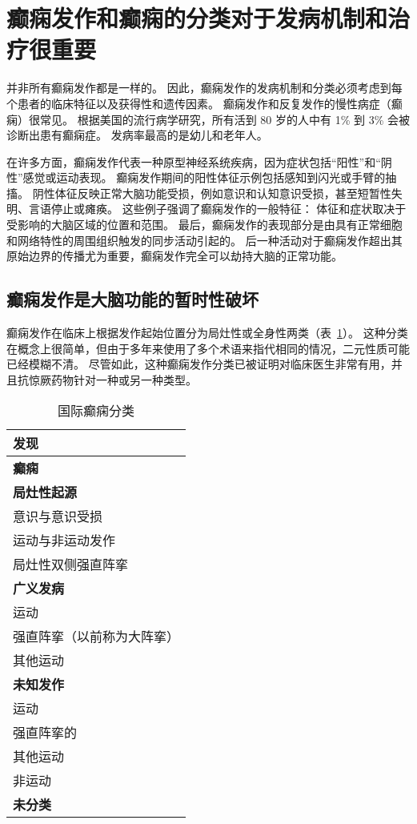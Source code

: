 \section{癫痫发作和癫痫的分类对于发病机制和治疗很重要}

并非所有癫痫发作都是一样的。
因此，癫痫发作的发病机制和分类必须考虑到每个患者的临床特征以及获得性和遗传因素。
癫痫发作和反复发作的慢性病症（癫痫）很常见。
根据美国的流行病学研究，所有活到 80 岁的人中有 1\% 到 3\% 会被诊断出患有癫痫症。
发病率最高的是幼儿和老年人。


在许多方面，癫痫发作代表一种原型神经系统疾病，因为症状包括“阳性”和“阴性”感觉或运动表现。
癫痫发作期间的阳性体征示例包括感知到闪光或手臂的抽搐。
阴性体征反映正常大脑功能受损，例如意识和认知意识受损，甚至短暂性失明、言语停止或瘫痪。
这些例子强调了癫痫发作的一般特征：
体征和症状取决于受影响的大脑区域的位置和范围。
最后，癫痫发作的表现部分是由具有正常细胞和网络特性的周围组织触发的同步活动引起的。
后一种活动对于癫痫发作超出其原始边界的传播尤为重要，癫痫发作完全可以劫持大脑的正常功能。



\subsection{癫痫发作是大脑功能的暂时性破坏}

癫痫发作在临床上根据发作起始位置分为局灶性或全身性两类（表~\ref{tab:58_1}）。
这种分类在概念上很简单，但由于多年来使用了多个术语来指代相同的情况，二元性质可能已经模糊不清。
尽管如此，这种癫痫发作分类已被证明对临床医生非常有用，并且抗惊厥药物针对一种或另一种类型。


\begin{table}[htbp]
	\caption{国际癫痫分类} \label{tab:58_1} \centering
	\begin{tabular}{l}
		\toprule
		发现 \\
		\midrule
		\textbf{癫痫} \\
		\textbf{局灶性起源} \\
		意识与意识受损 \\
		运动与非运动发作 \\
		局灶性双侧强直阵挛 \\
		\textbf{广义发病} \\
		运动 \\
		强直阵挛（以前称为大阵挛） \\
		其他运动 \\
		\textbf{未知发作} \\
		运动 \\
		强直阵挛的 \\
		其他运动 \\
		非运动 \\
		\textbf{未分类} \\
		\bottomrule
	\end{tabular}
\end{table}


